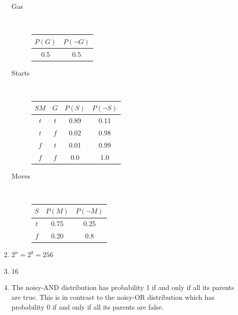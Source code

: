 \documentclass[10pt]{article}
\begin{document}
\begin{enumerate}
\begin{enumerate}
\begin{description}
    \item[Gas]
      \ \\
      \begin{tabular}{|c|c|}
      \hline
      $P(G)$ & $P(\neg G)$ \\ \hline
      0.5    & 0.5 \\
      \hline
      \end{tabular}

    \item[Starts]
      \ \\
      \begin{tabular}{|c|c|c|c|}
      \hline
      $SM$ & $G$ & $P(S)$ & $P(\neg S)$ \\ \hline
      $t$  & $t$ & 0.89   & 0.11 \\
      $t$  & $f$ & 0.02   & 0.98 \\
      $f$  & $t$ & 0.01   & 0.99 \\
      $f$  & $f$ & 0.0    & 1.0 \\
      \hline
      \end{tabular}

    \item[Moves]
      \ \\
      \begin{tabular}{|c|c|c|}
      \hline
      $S$ & $P(M)$ & $P(\neg M)$ \\ \hline
      $t$  & 0.75   & 0.25   \\
      $f$  & 0.20   & 0.8 \\
      \hline
      \end{tabular}
    \end{description}
  \item %
    $2^n = 2^8 = 256$
  \item %
    16
  \item %
    The noisy-AND distribution has probability 1 if and only if all its 
    parents are true.  This is in contrast to the noisy-OR distribution 
    which has probability 0 if and only if all its parents are false.
  \end{enumerate}


\end{enumerate}
\end{document}

